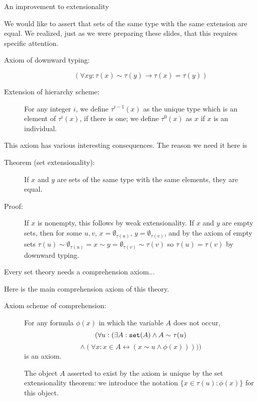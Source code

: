 \documentclass{slides}
\begin{document}
\begin{slide}
 {\Large An improvement to extensionality}

We would like to assert that sets of the same type with the same extension are equal.  We realized, just as we were preparing these slides, that this requires specific attention.

\begin{description}

\item[Axiom of downward typing:]  $$(\forall xy: \tau(x) \sim \tau(y) \rightarrow \tau(x) = \tau(y))$$

\item[Extension of hierarchy scheme:]  For any integer $i$, we define $\tau^{i-1}(x)$ as the unique type which is an element of $\tau^i(x)$, if there is one; we define $\tau^0(x)$ as $x$ if $x$ is an individual.

\end{description}

This axiom has various interesting consequences.  The reason we need it here is

\begin{description}

\item[Theorem (set extensionality):]  If $x$ and $y$ are sets of the same type with the same elements, they are equal.

\item[Proof:]  If $x$ is nonempty, this follows by weak extensionality.  If $x$ and $y$ are empty sets, then for some $u,v$, $x = \emptyset_{\tau(u)}$, $y = \emptyset_{\tau(v)}$, and by the axiom of empty sets $\tau(u) \sim \emptyset_{\tau(u)} = x \sim y = \emptyset_{\tau(v)} \sim \tau(v)$ so $\tau(u)=\tau(v)$ by downward typing.

\end{description}

\end{slide}

\begin{slide}



{\Large Every set theory needs a comprehension axiom$\ldots$}

Here is the main comprehension axiom of this theory.

\begin{description}

\item[Axiom scheme of comprehension:]  For any formula $\phi(x)$ in which the variable $A$ does not occur, $$(\forall u:(\exists A:{\tt set}(A) \wedge A \sim \tau(u) $$ $$ \wedge (\forall x:x \in A \leftrightarrow (x \sim u \wedge \phi(x)))))$$ is an axiom.

The  object $A$ asserted to exist by the axiom is unique by the set extensionality theorem:  we introduce the notation $\{x \in \tau(u):\phi(x)\}$ for this object.

\end{description}

\end{slide}
\end{document}

